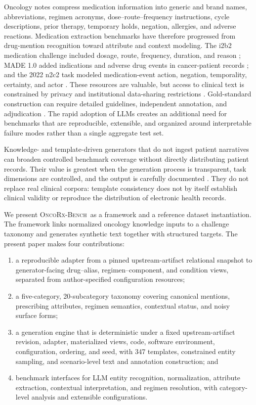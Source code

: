 \documentclass[conference]{IEEEtran}
\newcommand{\dataset}{\textsc{OncoRx-Bench}}
\newcommand{\kbadj}{upstream-artifact}
\newcommand{\kbadj}{UOTD}
\begin{document}
Oncology notes compress medication information into generic and brand names,
abbreviations, regimen acronyms, dose--route--frequency instructions, cycle
descriptions, prior therapy, temporary holds, negation, allergies, and adverse
reactions. Medication extraction benchmarks have therefore progressed from
drug-mention recognition toward attribute and context modeling. The i2b2
medication challenge included dosage, route, frequency, duration, and reason
\cite{uzuner2010}; MADE 1.0 added indications and adverse drug events in
cancer-patient records \cite{jagannatha2019}; and the 2022 n2c2 task modeled
medication-event action, negation, temporality, certainty, and actor
\cite{mahajan2023}. These resources are valuable, but access to clinical text is
constrained by privacy and institutional data-sharing restrictions
\cite{chapman2011}. Gold-standard construction can require detailed guidelines,
independent annotation, and adjudication \cite{uzuner2010annotation}. The rapid
adoption of LLMs creates an additional need for
benchmarks that are reproducible, extensible, and organized around interpretable
failure modes rather than a single aggregate test set.

Knowledge- and template-driven generators that do not ingest patient narratives
can broaden controlled benchmark coverage without directly distributing patient
records. Their value is greatest when the generation process is transparent,
task dimensions are controlled, and the output is carefully documented
\cite{walonoski2018,gebru2021}.
They do not replace real clinical corpora: template consistency does not by
itself establish clinical validity or reproduce the distribution of electronic
health records.

We present \dataset\ as a framework and a reference dataset instantiation. The
framework links normalized oncology knowledge inputs to a challenge taxonomy and
generates synthetic text together with structured targets. The present paper
makes four contributions:

\begin{enumerate}[leftmargin=*,nosep]
    \item a reproducible adapter from a pinned \kbadj{} relational snapshot to
    generator-facing drug--alias, regimen--component, and condition views,
    separated from author-specified configuration resources;
    \item a five-category, 20-subcategory taxonomy covering canonical
    mentions, prescribing attributes, regimen semantics, contextual status,
    and noisy surface forms;
    \item a generation engine that is deterministic under a fixed \kbadj{}
    revision, adapter, materialized views, code, software environment,
    configuration, ordering, and seed, with 347 templates, constrained entity
    sampling, and scenario-level text and annotation construction; and
    \item benchmark interfaces for LLM entity recognition, normalization,
    attribute extraction, contextual interpretation, and regimen resolution,
    with category-level analysis and extensible configurations.
\end{enumerate}
\end{document}
